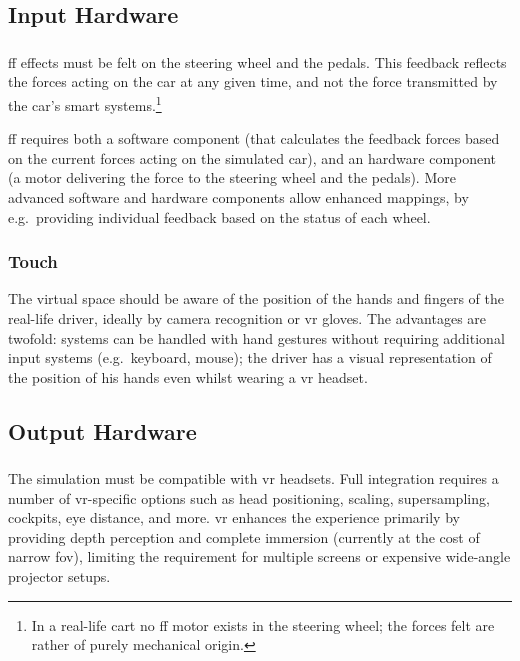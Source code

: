 \subsection{Input Hardware}

\subsubsection{}

\gls{ff} effects must be felt on the steering wheel and the pedals. This feedback reflects the forces acting on the car at any given time, and not the force transmitted by the car's smart systems.\footnote{In a real-life cart no \gls{ff} motor exists in the steering wheel; the forces felt are rather of purely mechanical origin.}

\gls{ff} requires both a software component (that calculates the feedback forces based on the current forces acting on the simulated car), and an hardware component (a motor delivering the force to the steering wheel and the pedals). More advanced software and hardware components allow enhanced mappings, by e.g.\ providing individual feedback based on the status of each wheel.

\subsubsection{Touch}

The virtual  space should be aware of the position of the hands and fingers of the real-life driver, ideally by camera recognition or \gls{vr} gloves. The advantages are twofold: systems can be handled with hand gestures without requiring additional input systems (e.g.\ keyboard, mouse); the driver has a visual representation of the position of his hands even whilst wearing a \gls{vr} headset.

\subsection{Output Hardware}

\subsubsection{}

The simulation must be compatible with \gls{vr} headsets. Full integration requires a number of \gls{vr}-specific options such as head positioning, scaling, supersampling,  cockpits, eye distance, and more. \gls{vr} enhances the experience primarily by providing depth perception and complete immersion (currently at the cost of narrow \gls{fov}), limiting the requirement for multiple screens or expensive wide-angle projector setups.

